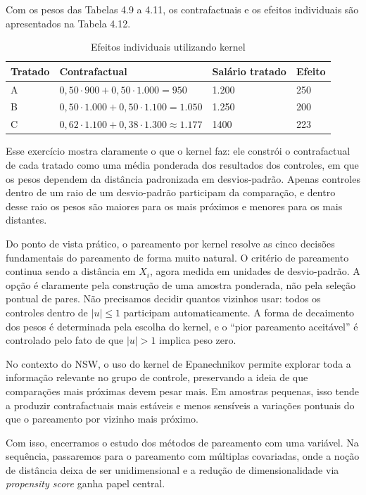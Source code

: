 Com os pesos das Tabelas 4.9 a 4.11, os contrafactuais e os efeitos individuais são apresentados na Tabela 4.12.

\begin{table}[h]
    \centering
    \begin{tabular}{llll}
         Tratado & Contrafactual & Salário tratado & Efeito\\\midrule
         A & $0,50 \cdot 900 + 0,50 \cdot 1.000 = 950$ & 1.200 & 250\\
         B & $0,50 \cdot 1.000 + 0,50 \cdot 1.100 = 1.050$ & 1.250  & 200\\
         C & $0,62 \cdot 1.100 + 0,38 \cdot 1.300 \approx 1.177$ & 1400 & 223\\\bottomrule
    \end{tabular}
    \caption{Efeitos individuais utilizando kernel}
    \label{tab:placeholder}
\end{table}

Esse exercício mostra claramente o que o kernel faz: ele constrói o contrafactual de cada tratado como uma média ponderada dos resultados dos controles, em que os pesos dependem da distância padronizada em desvios-padrão. Apenas controles dentro de um raio de um desvio-padrão participam da comparação, e dentro desse raio os pesos são maiores para os mais próximos e menores para os mais distantes.

Do ponto de vista prático, o pareamento por kernel resolve as cinco decisões fundamentais do pareamento de forma muito natural. O critério de pareamento continua sendo a distância em $X_i$, agora medida em unidades de desvio-padrão. A opção é claramente pela construção de uma amostra ponderada, não pela seleção pontual de pares. Não precisamos decidir quantos vizinhos usar: todos os controles dentro de $|u| \leq 1$ participam automaticamente. A forma de decaimento dos pesos é determinada pela escolha do kernel, e o “pior pareamento aceitável” é controlado pelo fato de que $|u| > 1$ implica peso zero.

No contexto do NSW, o uso do kernel de Epanechnikov permite explorar toda a informação relevante no grupo de controle, preservando a ideia de que comparações mais próximas devem pesar mais. Em amostras pequenas, isso tende a produzir contrafactuais mais estáveis e menos sensíveis a variações pontuais do que o pareamento por vizinho mais próximo.

Com isso, encerramos o estudo dos métodos de pareamento com uma variável. Na sequência, passaremos para o pareamento com múltiplas covariadas, onde a noção de distância deixa de ser unidimensional e a redução de dimensionalidade via \textit{propensity score} ganha papel central.